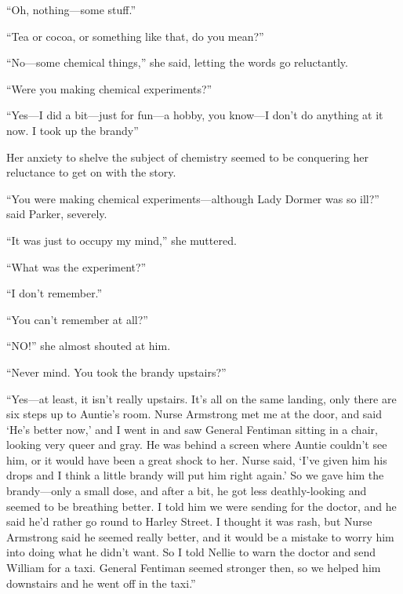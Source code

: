 \enquote{Oh, nothing\allowbreak---\allowbreak some stuff.}

\enquote{Tea or cocoa, or something like that, do you mean?}

\enquote{No\allowbreak---\allowbreak some chemical things,} she said, letting the words go reluctantly.

\enquote{Were you making chemical experiments?}

\enquote{Yes\allowbreak---\allowbreak I did a bit\allowbreak---\allowbreak just for fun\allowbreak---\allowbreak a hobby, you know\allowbreak---\allowbreak I don't do anything at it now. I took up the brandy\longdash}

Her anxiety to shelve the subject of chemistry seemed to be conquering her reluctance to get on with the story.

\enquote{You were making chemical experiments\allowbreak---\allowbreak although Lady Dormer was so ill?} said Parker, severely.

\enquote{It was just to occupy my mind,} she muttered.

\enquote{What was the experiment?}

\enquote{I don't remember.}

\enquote{You can't remember at all?}

\enquote{NO!} she almost shouted at him.

\enquote{Never mind. You took the brandy upstairs?}

\enquote{Yes\allowbreak---\allowbreak at least, it isn't really upstairs. It's all on the same landing, only there are six steps up to Auntie's room. Nurse Armstrong met me at the door, and said \enquote{He's better now,} and I went in and saw General Fentiman sitting in a chair, looking very queer and gray. He was behind a screen where Auntie couldn't see him, or it would have been a great shock to her. Nurse said, \enquote{I've given him his drops and I think a little brandy will put him right again.} So we gave him the brandy\allowbreak---\allowbreak only a small dose, and after a bit, he got less deathly-looking and seemed to be breathing better. I told him we were sending for the doctor, and he said he'd rather go round to Harley Street. I thought it was rash, but Nurse Armstrong said he seemed really better, and it would be a mistake to worry him into doing what he didn't want. So I told Nellie to warn the doctor and send William for a taxi. General Fentiman seemed stronger then, so we helped him downstairs and he went off in the taxi.}

